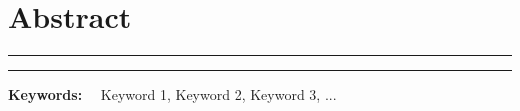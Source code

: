 \chapter*{Abstract} %


\begin{center}
\rule{\textwidth}{.75pt}\vspace*{1mm}
\textbf{{\Large \maintitle}}
\rule{\textwidth}{.75pt}
\end{center}
\vspace*{2ex}


\lipsum[1-4]

\vspace*{11pt}\noindent
\textbf{Keywords:} \ \ Keyword 1, Keyword 2, Keyword 3, ...
